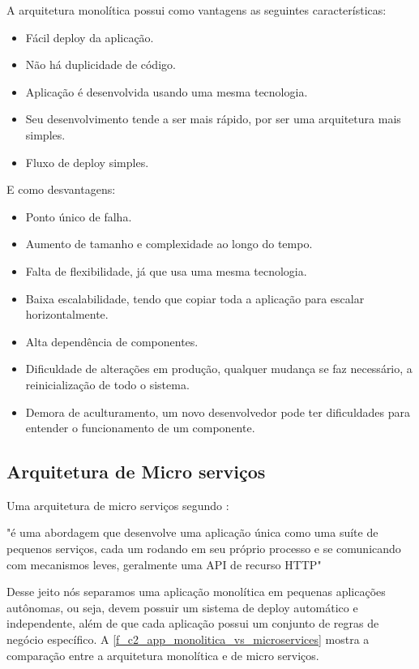 A arquitetura monolítica possui como vantagens as seguintes características:

\begin{itemize}
	\item Fácil deploy da aplicação.
	\item Não há duplicidade de código.
	\item Aplicação é desenvolvida usando uma mesma tecnologia.
	\item Seu desenvolvimento tende a ser mais rápido, por ser uma arquitetura mais simples.
	\item Fluxo de deploy simples.
\end{itemize}

E como desvantagens:
\begin{itemize}
	\item Ponto único de falha.
	\item Aumento de tamanho e complexidade ao longo do tempo.
	\item Falta de flexibilidade, já que usa uma mesma tecnologia.
	\item Baixa escalabilidade, tendo que copiar toda a aplicação para escalar horizontalmente.
	\item Alta dependência de componentes.
	\item Dificuldade de alterações em produção, qualquer mudança se faz necessário, a reinicialização de todo o sistema.
	\item Demora de aculturamento, um novo desenvolvedor pode ter dificuldades para entender o funcionamento de um componente.
\end{itemize}

\subsection{Arquitetura de Micro serviços}
Uma arquitetura de micro serviços segundo \cite{microservices2014}:  \begin{citacao}"é uma abordagem que desenvolve uma aplicação única como uma suíte de pequenos serviços, cada um rodando em seu próprio processo e se comunicando com mecanismos leves, geralmente uma \ac{API} de recurso \ac{HTTP}" \end{citacao} Desse jeito nós separamos uma aplicação monolítica em pequenas aplicações autônomas, ou seja, devem possuir um sistema de deploy automático e independente, além de que cada aplicação possui um conjunto de regras de negócio específico. A \autoref{f_c2_app_monolitica_vs_microservices} mostra a comparação entre a arquitetura monolítica e de micro serviços.



